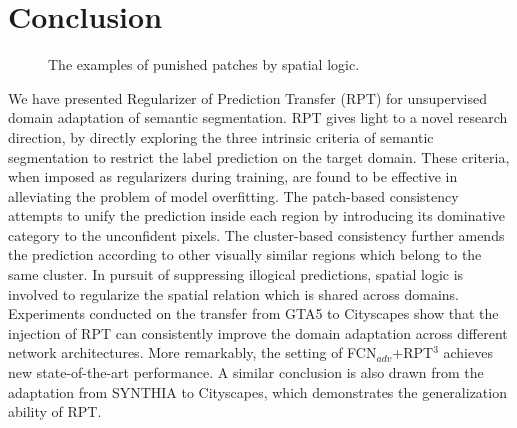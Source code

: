 \documentclass[10pt,twocolumn,letterpaper]{article}
\begin{document}
\section{Conclusion}
\begin{figure}[!tb]
   \caption{\small The examples of punished patches by spatial logic.}
   \label{fig:case_loss_logic}
   \vspace{-0.15in}
\end{figure}
We have presented Regularizer of Prediction Transfer (RPT) for unsupervised domain adaptation of semantic segmentation. RPT gives light to a novel research direction, by directly exploring the three intrinsic criteria of semantic segmentation to restrict the label prediction on the target domain. These criteria, when imposed as regularizers during training, are found to be effective in alleviating the problem of model overfitting.
The patch-based consistency attempts to unify the prediction inside each region by introducing its dominative category to the unconfident pixels. The cluster-based consistency further amends the prediction according to other visually similar regions which belong to the same cluster. In pursuit of suppressing illogical predictions, spatial logic is involved to regularize the spatial relation which is shared across domains.
Experiments conducted on the transfer from GTA5 to Cityscapes show that the injection of RPT can consistently improve the domain adaptation across different network architectures. More remarkably, the setting of FCN$_{adv}$+RPT$^{3}$ achieves new state-of-the-art performance. A similar conclusion is also drawn from the adaptation from SYNTHIA to Cityscapes, which demonstrates the generalization ability of RPT.


{\small


}
\end{document}

